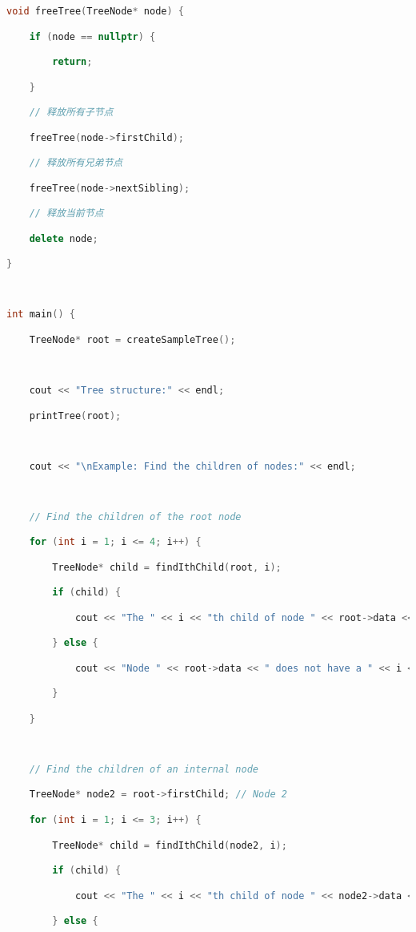 \begin{lstlisting}[language=C++]
void freeTree(TreeNode* node) {

    if (node == nullptr) {

        return;

    }

    // 释放所有子节点

    freeTree(node->firstChild);

    // 释放所有兄弟节点

    freeTree(node->nextSibling);

    // 释放当前节点

    delete node;

}

  

int main() {

    TreeNode* root = createSampleTree();

  

    cout << "Tree structure:" << endl;

    printTree(root);

  

    cout << "\nExample: Find the children of nodes:" << endl;

  

    // Find the children of the root node

    for (int i = 1; i <= 4; i++) {

        TreeNode* child = findIthChild(root, i);

        if (child) {

            cout << "The " << i << "th child of node " << root->data << " is: " << child->data << endl;

        } else {

            cout << "Node " << root->data << " does not have a " << i << "th child" << endl;

        }

    }

  

    // Find the children of an internal node

    TreeNode* node2 = root->firstChild; // Node 2

    for (int i = 1; i <= 3; i++) {

        TreeNode* child = findIthChild(node2, i);

        if (child) {

            cout << "The " << i << "th child of node " << node2->data << " is: " << child->data << endl;

        } else {


\end{lstlisting}

